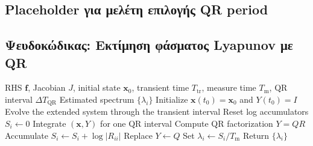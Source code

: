 \documentclass[11pt,a4paper]{report}
\newcommand{\thesisbibfile}{refs}
\begin{document}
\subsection{Placeholder για μελέτη επιλογής QR period}
\label{app:lyapunov-qr-period-placeholder}

\begin{center}
%
\end{center}

\subsection*{Ψευδοκώδικας: Εκτίμηση φάσματος Lyapunov με QR}
\begin{algorithm}[H]
\caption{Lyapunov spectrum via variational equations and periodic QR}
\label{alg:lyapunov-qr}
\begingroup
\small
\setlength{\parskip}{0pt}
\begin{algorithmic}[1]
\Require RHS $\mathbf{f}$, Jacobian $J$, initial state $\mathbf{x}_0$, transient time $T_{\mathrm{tr}}$, measure time $T_{\mathrm{m}}$, QR interval $\Delta T_{\mathrm{QR}}$
\Ensure Estimated spectrum $\{\lambda_i\}$
\State Initialize $\mathbf{x}(t_0)=\mathbf{x}_0$ and $Y(t_0)=I$
\State Evolve the extended system through the transient interval
\State Reset log accumulators $S_i \gets 0$
  \State Integrate $(\mathbf{x},Y)$ for one QR interval
  \State Compute QR factorization $Y = QR$
  \State Accumulate $S_i \gets S_i + \log |R_{ii}|$
  \State Replace $Y \gets Q$
\EndWhile
\State Set $\lambda_i \gets S_i / T_{\mathrm{m}}$
\State Return $\{\lambda_i\}$
\end{algorithmic}
\endgroup
\end{algorithm}





\end{document}
